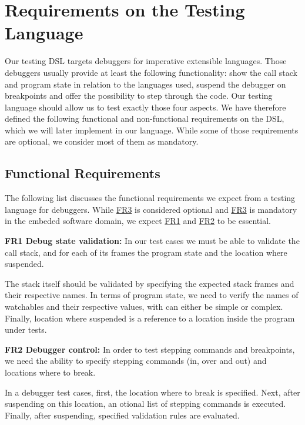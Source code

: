 \section{Requirements on the Testing Language}

Our testing \ac{DSL} targets debuggers for imperative extensible languages.
Those debuggers usually provide at least the following functionality:
show the call stack and program state in relation to the languages used, 
suspend the debugger on breakpoints and offer the possibility to 
step through the code. Our testing language should allow us to test exactly those
four aspects. We have therefore defined the following functional and
non-functional requirements on the \ac{DSL}, which we will later implement in
our language. While some of those requirements are optional, we consider most of
them as mandatory.

\subsection{Functional Requirements}

The following list discusses the functional requirements we expect from a
testing language for debuggers. While \hyperref[FR3]{FR3} is considered
optional and \hyperref[FR3]{FR3} is mandatory in the embeded software domain, we
expect \hyperref[FR1]{FR1} and \hyperref[FR2]{FR2} to be essential.
 
\noindent \textbf{\label{FR1}FR1 Debug state validation:} In our test cases we
must be able to validate the call stack, and for each of its frames 
the program state and the location where suspended. 

The stack itself should be validated by specifying the expected stack frames and
their respective names. In terms of program state, we need to verify the names 
of watchables and their respective values, with can either be simple or complex.
Finally, location where suspended is a reference to a location inside the program under tests. 

\noindent \textbf{\label{FR2}FR2 Debugger control:} In order to test stepping
commands and breakpoints, we need the ability to specify stepping commands
(in, over and out) and locations where to break.

In a debugger test cases,
first, the location where to break is specified. Next, after suspending on this
location, an otional list of stepping commands is executed. Finally, after
suspending, specified validation rules are evaluated.

